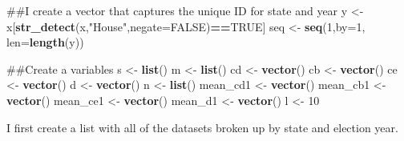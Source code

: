 \documentclass[]{article}
\newenvironment{Shaded}{\begin{snugshade}}{\end{snugshade}}
\newcommand{\KeywordTok}[1]{\textcolor[rgb]{0.13,0.29,0.53}{\textbf{#1}}}
\newcommand{\DataTypeTok}[1]{\textcolor[rgb]{0.13,0.29,0.53}{#1}}
\newcommand{\DecValTok}[1]{\textcolor[rgb]{0.00,0.00,0.81}{#1}}
\newcommand{\StringTok}[1]{\textcolor[rgb]{0.31,0.60,0.02}{#1}}
\newcommand{\OtherTok}[1]{\textcolor[rgb]{0.56,0.35,0.01}{#1}}
\newcommand{\ControlFlowTok}[1]{\textcolor[rgb]{0.13,0.29,0.53}{\textbf{#1}}}
\newcommand{\OperatorTok}[1]{\textcolor[rgb]{0.81,0.36,0.00}{\textbf{#1}}}
\newcommand{\NormalTok}[1]{#1}
\begin{document}
\begin{Shaded}
\begin{Highlighting}[]
\NormalTok{##I create a vector that captures the unique ID for state and year}
\NormalTok{y <-}\StringTok{ }\NormalTok{x[}\KeywordTok{str_detect}\NormalTok{(x,}\StringTok{"House"}\NormalTok{,}\DataTypeTok{negate=}\OtherTok{FALSE}\NormalTok{)}\OperatorTok{==}\OtherTok{TRUE}\NormalTok{]}
\NormalTok{seq <-}\StringTok{ }\KeywordTok{seq}\NormalTok{(}\DecValTok{1}\NormalTok{,}\DataTypeTok{by=}\DecValTok{1}\NormalTok{, }\DataTypeTok{len=}\KeywordTok{length}\NormalTok{(y))}

\NormalTok{##Create a variables}
\NormalTok{s <-}\StringTok{ }\KeywordTok{list}\NormalTok{()}
\NormalTok{m <-}\StringTok{ }\KeywordTok{list}\NormalTok{()}
\NormalTok{cd <-}\StringTok{ }\KeywordTok{vector}\NormalTok{()}
\NormalTok{cb <-}\StringTok{ }\KeywordTok{vector}\NormalTok{()}
\NormalTok{ce <-}\StringTok{ }\KeywordTok{vector}\NormalTok{()}
\NormalTok{d <-}\StringTok{ }\KeywordTok{vector}\NormalTok{()}
\NormalTok{n <-}\StringTok{ }\KeywordTok{list}\NormalTok{()}
\NormalTok{mean_cd1 <-}\StringTok{ }\KeywordTok{vector}\NormalTok{()}
\NormalTok{mean_cb1 <-}\StringTok{ }\KeywordTok{vector}\NormalTok{()}
\NormalTok{mean_ce1 <-}\StringTok{ }\KeywordTok{vector}\NormalTok{()}
\NormalTok{mean_d1 <-}\StringTok{ }\KeywordTok{vector}\NormalTok{()}
\NormalTok{l <-}\StringTok{ }\DecValTok{10}
\end{Highlighting}
\end{Shaded}

I first create a list with all of the datasets broken up by state and
election year.

\begin{Shaded}
\end{Shaded}
\end{document}
